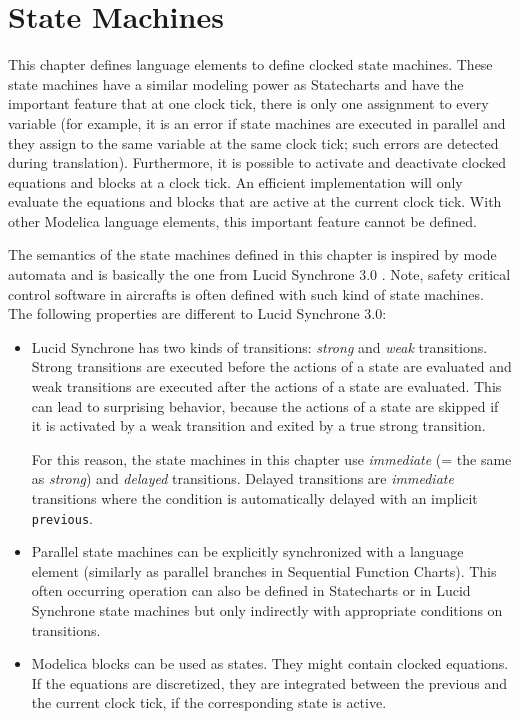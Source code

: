 \chapter{State Machines}\label{state-machines}

This chapter defines language elements to define clocked state machines.
These state machines have a similar modeling power as Statecharts \parencite{Harel1987Statecharts} and have the important feature that at one clock tick, there is only one assignment to every variable (for example, it is an error if state machines are executed in parallel and they assign to the same variable at the same clock tick; such errors are detected during translation).
Furthermore, it is possible to activate and deactivate clocked equations and blocks at a clock tick.
An efficient implementation will only evaluate the equations and blocks that are active at the current clock tick.
With other Modelica language elements, this important feature cannot be defined.

The semantics of the state machines defined in this chapter is inspired by mode automata and is basically the one from Lucid Synchrone 3.0 \parencite{Pouzet2006LucidSynchrone30}.
Note, safety critical control software in aircrafts is often defined with such kind of state machines.
The following properties are different to Lucid Synchrone 3.0:
\begin{itemize}
\item
  Lucid Synchrone has two kinds of transitions: \emph{strong} and \emph{weak} transitions.
  Strong transitions are executed before the actions of a state are evaluated and weak transitions are executed after the actions of a state are evaluated.
  This can lead to surprising behavior, because the actions of a state are skipped if it is activated by a weak transition and exited by a true strong transition.

  For this reason, the state machines in this chapter use \emph{immediate} (= the same as \emph{strong}) and \emph{delayed} transitions.
  Delayed transitions are \emph{immediate} transitions where the condition is automatically delayed with an implicit \lstinline!previous!.
\item
  Parallel state machines can be explicitly synchronized with a language element (similarly as parallel branches in Sequential Function Charts).
  This often occurring operation can also be defined in Statecharts or in Lucid Synchrone state machines but only indirectly with appropriate conditions on transitions.
\item
  Modelica blocks can be used as states.
  They might contain clocked equations.
  If the equations are discretized, they are integrated between the previous and the current clock tick, if the corresponding state is active.
\end{itemize}

